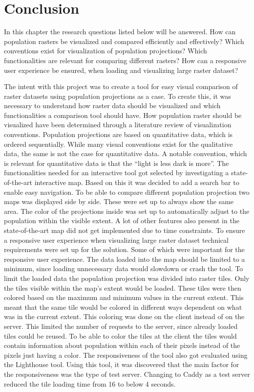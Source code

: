 \chapter{Conclusion}
In this chapter the research questions listed below will be answered.
How can population rasters be visualized and compared efficiently and effectively?
Which conventions exist for visualization of population projections?
Which functionalities are relevant for comparing different rasters?
How can a responsive user experience be ensured, when loading and visualizing large raster dataset?


The intent with this project was to create a tool for easy visual comparison of raster datasets using population projections as a case. To create this, it was necessary to understand how raster data should be visualized and which functionalities a comparison tool should have.
How population raster should be visualized have been determined through a literature review of visualization conventions. 	
Population projections are based on quantitative data, which is ordered sequentially. While many visual conventions exist for the qualitative data, the same is not the case for quantitative data. A notable convention, which is relevant for quantitative data is that the “light is less dark is more”.
The functionalities needed for an interactive tool got selected by investigating a state-of-the-art interactive map. Based on this it was decided to add a search bar to enable easy navigation. 
To be able to compare different population projection two maps was displayed side by side. These were set up to always show the same area. The color of the projections inside was set up to automatically adjust to the population within the visible extent.
A lot of other features also present in the state-of-the-art map did not get implemented due to time constraints. 
To ensure a responsive user experience when visualizing large raster dataset technical requirements were set up for the solution. Some of which were important for the responsive user experience. The data loaded into the map should be limited to a minimum, since loading unnecessary data would slowdown or crash the tool. To limit the loaded data the population projection was divided into raster tiles. Only the tiles visible within the map’s extent would be loaded. These tiles were then colored based on the maximum and minimum values in the current extent. This meant that the same tile would be colored in different ways dependent on what was in the current extent. This coloring was done on the client instead of on the server.  This limited the number of requests to the server, since already loaded tiles could be reused. To be able to color the tiles at the client the tiles would contain information about population within each of their pixels instead of the pixels just having a color.
The responsiveness of the tool also got evaluated using the Lighthouse tool. Using this tool, it was discovered that the main factor for the responsiveness was the type of test server. Changing to Caddy as a test server reduced the tile loading time from 16 to below 4 seconds.
